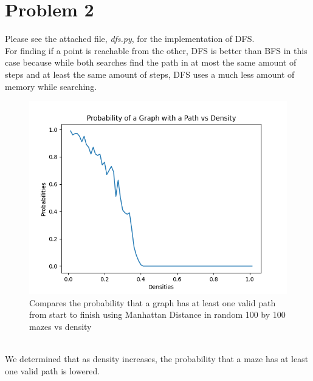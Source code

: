 \documentclass[12pt]{report}
\begin{document}
\section{Problem 2}
Please see the attached file, \emph{dfs.py}, for the implementation of DFS.\\
For finding if a point is reachable from the other, DFS is better than BFS in this case because while both searches find the path in at most the same amount of steps and at least the same amount of steps, DFS uses a much less amount of memory while searching.
\begin{figure}[h]
\includegraphics[width=\textwidth]{Probability of a Graph with Path vs Density.png}
\caption{Compares the probability that a graph has at least one valid path from start to finish using Manhattan Distance in random 100 by 100 mazes vs density}
\label{Probability of a Graph with a Complete Path vs Density}
\end{figure}\\
We determined that as density increases, the probability that a maze has at least one valid path is lowered.

\break
\end{document}
